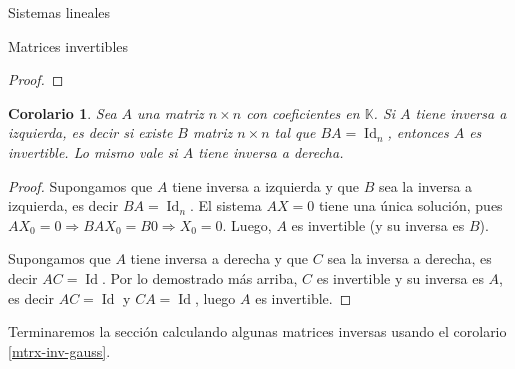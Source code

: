 \documentclass[a4paper,12pt,twoside,spanish,reqno]{amsbook}
\newtheorem{corolario}[teorema]{Corolario}
\theoremstyle{definition}
\theoremstyle{remark}
\newcommand{\Id}{\operatorname{Id}}
\newcommand{\K}{\mathbb K}
\begin{document}
\begin{chapter}{Sistemas lineales}
\begin{section}{Matrices invertibles}
\begin{proof}
            \end{proof}
            
            \begin{corolario}
                Sea $A$ una matriz $n \times n$ con coeficientes  en $\K$. Si $A$ tiene inversa a izquierda,  es decir si existe $B$ matriz $n \times n$ tal que $BA=\Id_n$,   entonces $A$ es invertible.  Lo mismo vale si $A$ tiene inversa a derecha. 
            \end{corolario}	
            \begin{proof}
                Supongamos que  $A$ tiene inversa a izquierda y  que $B$ sea la inversa a izquierda,  es decir $BA=\Id_n$. El sistema $AX=0$ tiene una única solución, pues $AX_0=0 \Rightarrow BAX_0=B0 \Rightarrow X_0=0$. Luego, $A$  es invertible (y su inversa es $B$). 
                
                Supongamos que  $A$ tiene inversa a derecha y  que $C$ sea la inversa a derecha, es decir $AC=\Id$. Por lo demostrado más arriba, $C$ es invertible y su inversa es $A$, es decir $AC=\Id$ y $CA=\Id$, luego $A$  es invertible. 
            \end{proof}	
            
            
            
            Terminaremos la  sección calculando algunas matrices inversas usando el corolario  \ref{mtrx-inv-gauss}. 
            

\end{section}
\end{chapter}
\end{document}
